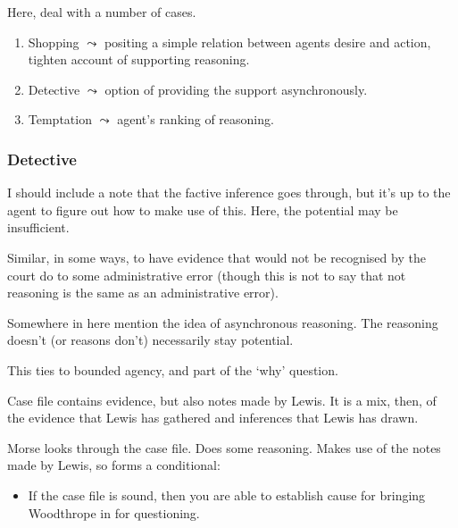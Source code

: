 \documentclass[10pt]{article}
\begin{document}
\begin{note}[Cases]
  Here, deal with a number of cases.
  \begin{enumerate}
  \item Shopping \(\leadsto\) positing a simple relation between agents desire and action, tighten account of supporting reasoning.
  \item Detective \(\leadsto\) option of providing the support asynchronously.
  \item Temptation \(\leadsto\) agent's ranking of reasoning.
  \end{enumerate}
\end{note}


\subsubsection{Detective}
\label{sec:detective}

\begin{note}
  I should include a note that the factive inference goes through, but it's up to the agent to figure out how to make use of this.
  Here, the potential may be insufficient.

  Similar, in some ways, to have evidence that would not be recognised by the court do to some administrative error (though this is not to say that not reasoning is the same as an administrative error).
\end{note}

\begin{note}[Async]
  Somewhere in here mention the idea of asynchronous reasoning.
  The reasoning doesn't (or reasons don't) necessarily stay potential.

  This ties to bounded agency, and part of the `why' question.
\end{note}

\begin{scenario}
  Case file contains evidence, but also notes made by Lewis.
  It is a mix, then, of the evidence that Lewis has gathered and inferences that Lewis has drawn.

  Morse looks through the case file.
  Does some reasoning.
  Makes use of the notes made by Lewis, so forms a conditional:

  \begin{itemize}
  \item If the case file is sound, then you are able to establish cause for bringing Woodthrope in for questioning.
  \end{itemize}

\end{scenario}
\end{document}
